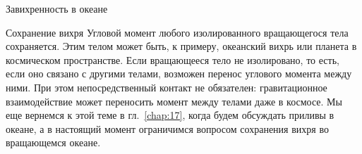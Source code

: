 \begin{chapter}{Завихренность в океане}
\begin{section}{Сохранение вихря}
Угловой момент любого изолированного вращающегося тела
сохраняется. Этим телом может быть, к примеру, океанский вихрь или планета 
в космическом пространстве. Если вращающееся тело не изолировано, то есть,
если оно связано с другими телами, возможен перенос углового момента
между ними. При этом непосредственный контакт не обязателен: гравитационное 
взаимодействие может переносить момент между телами даже в космосе. 
Мы еще вернемся к этой теме в гл.~\ref{chap:17}, когда будем
обсуждать приливы в океане, а в настоящий момент ограничимся вопросом
сохранения вихря во вращающемся океане.
%



\end{section}
\end{chapter}
